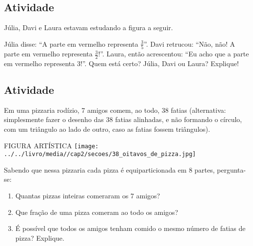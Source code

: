 \subsection{Atividade}

Júlia, Davi e Laura estavam estudando a figura a seguir.
\begin{center}
\end{center}
Júlia disse: ``A parte em vermelho representa $\frac{3}{5}$''. Davi retrucou: ``Não, não! A parte em vermelho representa $\frac{3}{2}$!''. Laura, então acrescentou: ``Eu acho que a parte em vermelho representa $3$!''. Quem está certo? Júlia, Davi ou Laura? Explique!

\subsection{Atividade}

Em uma pizzaria rodízio, 7 amigos comem, ao todo, 38 fatias (alternativa: simplesmente fazer o desenho das 38 fatias alinhadas, e não formando o círculo, com um triângulo ao lado de outro, caso as fatias fossem triângulos).
\begin{imagem*}[breakable]{}{}   FIGURA ARTÍSTICA   
    \texttt{[image: ../../livro/media//cap2/secoes/38\_oitavos\_de\_pizza.jpg]}  
\end{imagem*}

Sabendo que nessa pizzaria cada pizza é equiparticionada em 8 partes, pergunta-se: 
\begin{enumerate} [\quad a)] %
  \item     Quantas pizzas inteiras comeraram os 7 amigos? 
  \item     Que fração de uma pizza comeram  ao todo os amigos? 
  \item     É possível que todos os amigos tenham comido o mesmo número de fatias de pizza? Explique.
\end{enumerate} %

